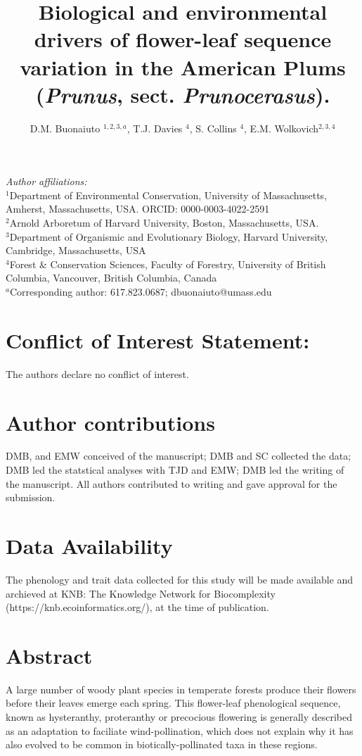 \documentclass{article}[11pt]
\title{Biological and environmental drivers of flower-leaf sequence variation in the American Plums (\emph{Prunus}, sect. \emph{Prunocerasus}). }
\author{D.M. Buonaiuto $^{1,2,3,a}$, T.J. Davies $^{4}$, S. Collins $^{4}$, E.M. Wolkovich$^{2,3,4}$}
\begin{document}

\maketitle
\noindent \emph{Author affiliations:}\\
\noindent $^1$Department of Environmental Conservation, University of Massachusetts, Amherst, Massachusetts, USA. ORCID: 0000-0003-4022-2591\\
\noindent 
$^2$Arnold Arboretum of Harvard University, Boston, Massachusetts, USA.\\
$^3$Department of Organismic and Evolutionary Biology, Harvard University, Cambridge, Massachusetts, USA \\
$^4$Forest \& Conservation Sciences, Faculty of Forestry, University of British Columbia, Vancouver, British Columbia, Canada\\
$^a$Corresponding author: 617.823.0687; dbuonaiuto@umass.edu\\

\section*{Conflict of Interest Statement:}
The authors declare no conflict of interest.

\section*{Author contributions}
DMB, and EMW conceived of the manuscript; DMB and SC collected the data; DMB led the statstical analyses with TJD and EMW; DMB led the writing of the manuscript. All authors contributed to writing and gave approval for the submission.

\section*{Data Availability}
The phenology and trait data collected for this study will be made available and archieved at KNB: The Knowledge Network for Biocomplexity (https://knb.ecoinformatics.org/), at the time of publication.

\pagebreak

\section*{Abstract}
A large number of woody plant species in temperate forests produce their flowers before their leaves emerge each spring. This flower-leaf phenological sequence, known as hysteranthy, proteranthy or precocious flowering is generally described as an adaptation to faciliate wind-pollination, which does not explain why it has also evolved to be common in biotically-pollinated taxa in these regions. 
\end{document}
